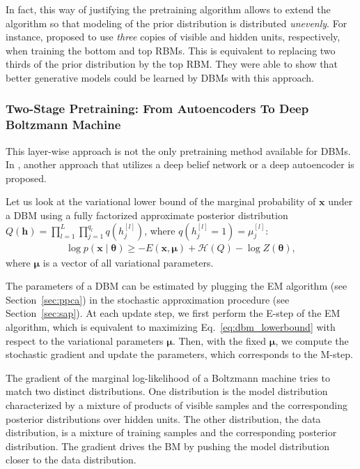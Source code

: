 \documentclass[dissertation,nocontribution,draft*]{aaltoseries}
\newcommand{\qlay}[1]{\left[#1\right]}
\newcommand{\vect}[1]{\mathbf{#1}}
\newcommand{\vects}[1]{\boldsymbol{#1}}
\newcommand{\vh}[0]{\vect{h}}
\newcommand{\vx}[0]{\vect{x}}
\newcommand{\vmu}[0]{\vects{\mu}}
\newcommand{\TT}[0]{{\vects{\theta}}}
\newcommand{\HH}[0]{\mathcal{H}}
\begin{document}
In fact, this way of justifying the pretraining algorithm
allows to extend the algorithm so that 
modeling of the prior distribution is distributed
\textit{unevenly}. For instance, \citet{Salakhutdinov2012}
proposed to use \textit{three} copies of visible and hidden
units, respectively, when training the bottom and top RBMs.
This is equivalent to replacing two thirds of the prior
distribution by the top RBM. They were able to show that
better generative models could be learned by DBMs with this
approach.

\subsubsection{Two-Stage Pretraining: From Autoencoders To
Deep Boltzmann Machine}

This layer-wise approach is not the only pretraining method
available for DBMs. In , another
approach that utilizes a deep belief network or a deep
autoencoder is proposed.

Let us look at the variational lower bound of the marginal
probability of $\vx$ under a DBM using a fully factorized
approximate posterior distribution \\
$Q(\vh) = \prod_{l=1}^L
\prod_{j=1}^{q_l} q(h_j^{\qlay{l}})$, where $q(h_j^{\qlay{l}}=1) =
\mu_j^{\qlay{l}}$:
\begin{align}
    \label{eq:dbm_lowerbound}
    \log p(\vx \mid \TT) \geq  -E (\vx, \vmu) + \HH(Q) - \log Z(\TT),
\end{align}
where $\vmu$ is a vector of all variational parameters.

The parameters of a DBM can be estimated by plugging the EM
algorithm (see Section~\ref{sec:ppca}) in the stochastic
approximation procedure (see Section~\ref{sec:sap}). At each
update step, we first perform the E-step of the EM
algorithm, which is equivalent to maximizing
Eq.~\eqref{eq:dbm_lowerbound} with respect to the
variational parameters $\vmu$. Then, with the fixed $\vmu$,
we compute the stochastic gradient and update the
parameters, which corresponds to the M-step.

The gradient of the marginal log-likelihood of a Boltzmann
machine tries to match two distinct distributions. One
distribution is the model distribution characterized by a
mixture of products of visible samples and the corresponding
posterior distributions over hidden units. The other
distribution, the data distribution, is a mixture of
training samples and the corresponding posterior
distribution. The gradient drives the BM by pushing the
model distribution closer to the data distribution.
\end{document}
